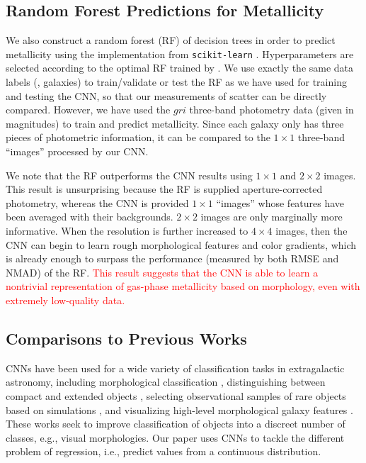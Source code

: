 \documentclass[fleqn,usenatbib]{mnras}
\newcommand{\editorial}[1]{\textcolor{red}{#1}}
\begin{document}
\subsection{Random Forest Predictions for Metallicity}
We also construct a random forest (RF) of decision trees in order to predict metallicity using the implementation from \texttt{scikit-learn} \citep{Pedregosa2012}. Hyperparameters are selected according to the optimal RF trained by \cite{Acquaviva2016}. We use exactly the same data labels (\ie, galaxies) to train/validate or test the RF as we have used for training and testing the CNN, so that our measurements of scatter can be directly compared. However, we have used the $gri$ three-band photometry data (given in magnitudes) to train and predict metallicity. Since each galaxy only has three pieces of photometric information, it can be compared to the $1 \times 1$ three-band ``images'' processed by our CNN.

We note that the RF outperforms the CNN results using $1\times 1$ and $2 \times 2$ images.
This result is unsurprising because the RF is supplied aperture-corrected photometry, whereas the CNN is provided $1 \times 1 $ \sdssi\sdssr\sdssg ``images'' whose features have been averaged with their backgrounds. $2 \times 2$ images are only marginally more informative. When the resolution is further increased to $4 \times 4$ images, then the CNN can begin to learn rough morphological features and color gradients, which is already enough to surpass the performance (measured by both RMSE and NMAD) of the RF.
\editorial{This result suggests that the CNN is able to learn a nontrivial representation of gas-phase metallicity based on morphology, even with extremely low-quality data.}

\subsection{Comparisons to Previous Works}\label{sec:previous work}
CNNs have been used for a wide variety of classification tasks in extragalactic astronomy, including morphological classification , distinguishing between compact and extended objects \citep{Kim2017}, selecting observational samples of rare objects based on simulations \citep{Huertas-Company2018, Lanusse2017}, and visualizing high-level morphological galaxy features \citep{2018arXiv180705657D}.
These works seek to improve classification of objects into a discreet number of classes, e.g., visual morphologies. Our paper uses CNNs to tackle the different problem of regression, i.e., predict values from a continuous distribution.
\end{document}
